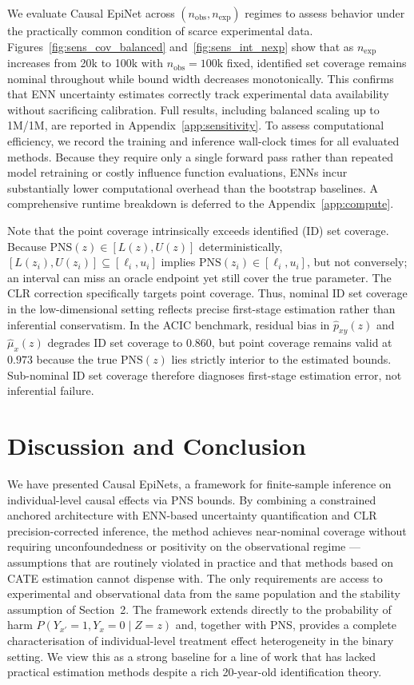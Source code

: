 \documentclass[accepted]{uai2026} %
\theoremstyle{plain}
\theoremstyle{definition}
\theoremstyle{remark}
\begin{document}
We evaluate Causal EpiNet across $(n_{\mathrm{obs}}, n_{\mathrm{exp}})$ regimes to assess behavior under the practically common condition of scarce experimental data. Figures~\ref{fig:sens_cov_balanced} and~\ref{fig:sens_int_nexp} show that as $n_{\mathrm{exp}}$ increases from 20k to 100k with $n_{\mathrm{obs}} = 100\text{k}$ fixed, identified set coverage remains nominal throughout while bound width decreases monotonically. This confirms that ENN uncertainty estimates correctly track experimental data availability without sacrificing calibration. Full results, including balanced scaling up to 1M/1M, are reported in Appendix~\ref{app:sensitivity}. To assess computational efficiency, we record the training and inference wall-clock times for all evaluated methods. Because they require only a single forward pass rather than repeated model retraining or costly influence function evaluations, ENNs incur substantially lower computational overhead than the bootstrap baselines. A comprehensive runtime breakdown is deferred to the Appendix~\ref{app:compute}.

Note that the point coverage intrinsically exceeds identified (ID) set coverage. Because $\mathrm{PNS}(z) \in [L(z), U(z)]$ deterministically, $[L(z_i), U(z_i)] \subseteq [\ell_i, u_i]$ implies $\mathrm{PNS}(z_i) \in [\ell_i, u_i]$, but not conversely; an interval can miss an oracle endpoint yet still cover the true parameter. The CLR correction specifically targets point coverage. Thus, nominal ID set coverage in the low-dimensional setting reflects precise first-stage estimation rather than inferential conservatism. In the ACIC benchmark, residual bias in $\hat{p}_{xy}(z)$ and $\hat{\mu}_x(z)$ degrades ID set coverage to $0.860$, but point coverage remains valid at $0.973$ because the true $\mathrm{PNS}(z)$ lies strictly interior to the estimated bounds. Sub-nominal ID set coverage therefore diagnoses first-stage estimation error, not inferential failure.


\vspace{-0.5em}
\section{Discussion and Conclusion}
\vspace{-0.5em}
We have presented Causal EpiNets, a framework for finite-sample inference on
individual-level causal effects via PNS bounds. By combining a constrained anchored
architecture with ENN-based uncertainty quantification and CLR precision-corrected
inference, the method achieves near-nominal coverage without requiring unconfoundedness
or positivity on the observational regime — assumptions that are routinely violated in
practice and that methods based on CATE estimation cannot dispense with. The only
requirements are access to experimental and observational data from the same
population and the stability assumption of Section~2. The framework extends directly
to the probability of harm $P(Y_{x'} = 1, Y_x = 0 \mid Z = z)$ and, together with
PNS, provides a complete characterisation of individual-level treatment effect
heterogeneity in the binary setting. We view this as a strong baseline for a line of
work that has lacked practical estimation methods despite a rich 20-year-old
identification theory.
\end{document}
